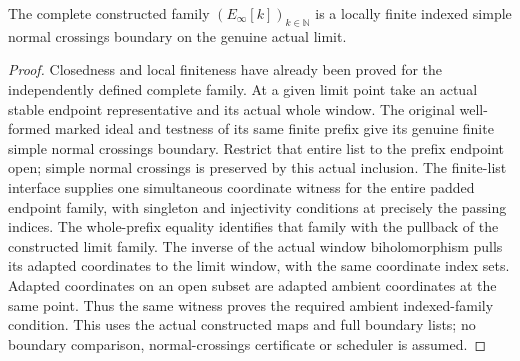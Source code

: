 \begin{theorem}
\label{hir:actual-lf-boundary-whole-indexed-snc}
\leanok
The complete constructed family $(E_\infty[k])_{k\in\mathbb N}$ is a locally
finite indexed simple normal crossings boundary on the genuine actual limit.
\end{theorem}
\begin{proof}
Closedness and local finiteness have already been proved for the independently
defined complete family.  At a given limit point take an actual stable endpoint
representative and its actual whole window.  The original well-formed marked
ideal and testness of its same finite prefix give its genuine finite simple
normal crossings boundary.  Restrict that entire list to the prefix endpoint
open; simple normal crossings is preserved by this actual inclusion.  The
finite-list interface supplies one simultaneous coordinate witness for the
entire padded endpoint family, with singleton and injectivity conditions at
precisely the passing indices.  The whole-prefix equality identifies that
family with the pullback of the constructed limit family.  The inverse of the
actual window biholomorphism pulls its adapted coordinates to the limit window,
with the same coordinate index sets.  Adapted coordinates
on an open subset are adapted ambient coordinates at the same point.  Thus the
same witness proves the required ambient indexed-family condition.  This uses
the actual constructed maps and full boundary lists; no boundary comparison,
normal-crossings certificate or scheduler is assumed.
\end{proof}
